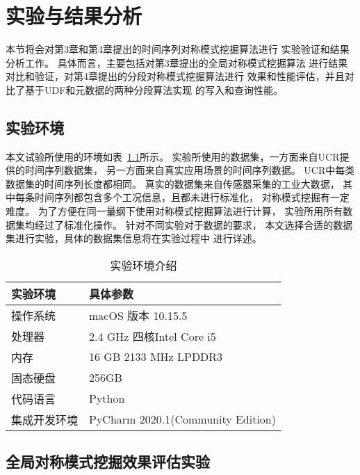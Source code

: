 
\chapter{实验与结果分析}
本节将会对第3章和第4章提出的时间序列对称模式挖掘算法进行
实验验证和结果分析工作。
具体而言，主要包括对第3章提出的全局对称模式挖掘算法
进行结果对比和验证，对第4章提出的分段对称模式挖掘算法进行
效果和性能评估，并且对比了基于UDF和元数据的两种分段算法实现
的写入和查询性能。

\section{实验环境}
本文试验所使用的环境如表~\ref{tab:experiment_enviroment}所示。
实验所使用的数据集，一方面来自UCR提供的时间序列数据集，
另一方面来自真实应用场景的时间序列数据。
UCR中每类数据集的时间序列长度都相同。
真实的数据集来自传感器采集的工业大数据，
其中每条时间序列都包含多个工况信息，且都未进行标准化，
对称模式挖掘有一定难度。
为了方便在同一量纲下使用对称模式挖掘算法进行计算，
实验所用所有数据集均经过了标准化操作。
针对不同实验对于数据的要求，
本文选择合适的数据集进行实验，具体的数据集信息将在实验过程中
进行详述。

\begin{table}
  \centering
  \caption{实验环境介绍}
  \begin{tabular}{ll}
    \toprule
    实验环境     & 具体参数                          \\
    \midrule
    操作系统     & macOS 版本 10.15.5                \\
    处理器       & 2.4 GHz 四核Intel Core i5         \\
    内存         & 16 GB 2133 MHz LPDDR3             \\
    固态硬盘     & 256GB                             \\
    代码语言     & Python                            \\
    集成开发环境 & PyCharm 2020.1(Community Edition) \\
    \bottomrule
  \end{tabular}
  \label{tab:experiment_enviroment}
\end{table}

\section{全局对称模式挖掘效果评估实验}


